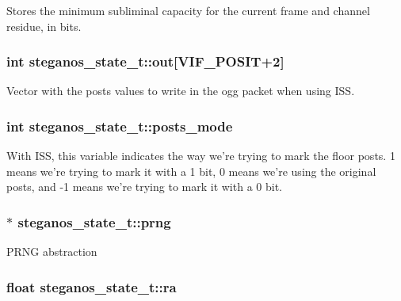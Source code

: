\label{structsteganos__state__t_a30506b9be18bd2a58856d6ba5a3fd15f}
Stores the minimum subliminal capacity for the current frame and channel residue, in bits. \hypertarget{structsteganos__state__t_ac2ef43fc18298daa20ecfc6357f93e5b}{
\subsubsection[{out}]{\setlength{\rightskip}{0pt plus 5cm}int {\bf steganos\_\-state\_\-t::out}\mbox{[}VIF\_\-POSIT+2\mbox{]}}}
\label{structsteganos__state__t_ac2ef43fc18298daa20ecfc6357f93e5b}
Vector with the posts values to write in the ogg packet when using ISS. \hypertarget{structsteganos__state__t_ab843be033e7bfc4839814d751ba3f0b7}{
\subsubsection[{posts\_\-mode}]{\setlength{\rightskip}{0pt plus 5cm}int {\bf steganos\_\-state\_\-t::posts\_\-mode}}}
\label{structsteganos__state__t_ab843be033e7bfc4839814d751ba3f0b7}
With ISS, this variable indicates the way we're trying to mark the floor posts. 1 means we're trying to mark it with a 1 bit, 0 means we're using the original posts, and -\/1 means we're trying to mark it with a 0 bit. \hypertarget{structsteganos__state__t_a8572fc70a201b28fe897eaa304caf400}{
\subsubsection[{prng}]{$\ast$ {\bf steganos\_\-state\_\-t::prng}}}
\label{structsteganos__state__t_a8572fc70a201b28fe897eaa304caf400}
PRNG abstraction \hypertarget{structsteganos__state__t_a35b6704fbd31ab23984a713fdcef43a8}{
\subsubsection[{ra}]{\setlength{\rightskip}{0pt plus 5cm}float {\bf steganos\_\-state\_\-t::ra}}}
